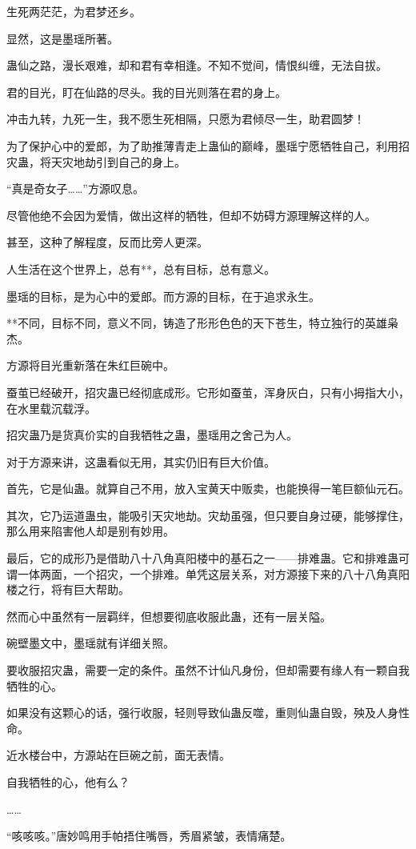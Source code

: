 \begin{this_body}
生死两茫茫，为君梦还乡。

显然，这是墨瑶所著。

蛊仙之路，漫长艰难，却和君有幸相逢。不知不觉间，情恨纠缠，无法自拔。

君的目光，盯在仙路的尽头。我的目光则落在君的身上。

冲击九转，九死一生，我不愿生死相隔，只愿为君倾尽一生，助君圆梦！

为了保护心中的爱郎，为了助推薄青走上蛊仙的巅峰，墨瑶宁愿牺牲自己，利用招灾蛊，将天灾地劫引到自己的身上。

“真是奇女子……”方源叹息。

尽管他绝不会因为爱情，做出这样的牺牲，但却不妨碍方源理解这样的人。

甚至，这种了解程度，反而比旁人更深。

人生活在这个世界上，总有**，总有目标，总有意义。

墨瑶的目标，是为心中的爱郎。而方源的目标，在于追求永生。

**不同，目标不同，意义不同，铸造了形形色色的天下苍生，特立独行的英雄枭杰。

方源将目光重新落在朱红巨碗中。

蚕茧已经破开，招灾蛊已经彻底成形。它形如蚕茧，浑身灰白，只有小拇指大小，在水里载沉载浮。

招灾蛊乃是货真价实的自我牺牲之蛊，墨瑶用之舍己为人。

对于方源来讲，这蛊看似无用，其实仍旧有巨大价值。

首先，它是仙蛊。就算自己不用，放入宝黄天中贩卖，也能换得一笔巨额仙元石。

其次，它乃运道蛊虫，能吸引天灾地劫。灾劫虽强，但只要自身过硬，能够撑住，那么用来陷害他人却是别有妙用。

最后，它的成形乃是借助八十八角真阳楼中的基石之一——排难蛊。它和排难蛊可谓一体两面，一个招灾，一个排难。单凭这层关系，对方源接下来的八十八角真阳楼之行，将有巨大帮助。

然而心中虽然有一层羁绊，但想要彻底收服此蛊，还有一层关隘。

碗壁墨文中，墨瑶就有详细关照。

要收服招灾蛊，需要一定的条件。虽然不计仙凡身份，但却需要有缘人有一颗自我牺牲的心。

如果没有这颗心的话，强行收服，轻则导致仙蛊反噬，重则仙蛊自毁，殃及人身性命。

近水楼台中，方源站在巨碗之前，面无表情。

自我牺牲的心，他有么？

……

“咳咳咳。”唐妙鸣用手帕捂住嘴唇，秀眉紧皱，表情痛楚。


\end{this_body}
